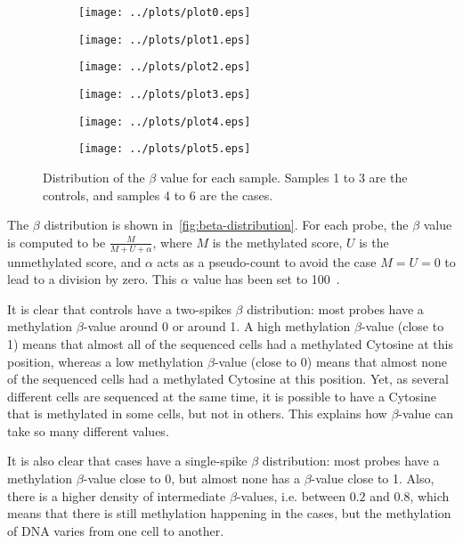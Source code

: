 \documentclass{article}
\begin{document}
\begin{figure*}[!t]
	\begin{subfigure}{.33\textwidth}
	\texttt{[image: ../plots/plot0.eps]}
	\end{subfigure}
	\begin{subfigure}{.33\textwidth}
	\texttt{[image: ../plots/plot1.eps]}
	\end{subfigure}
	\begin{subfigure}{.33\textwidth}
	\texttt{[image: ../plots/plot2.eps]}
	\end{subfigure}
	\begin{subfigure}{.33\textwidth}
	\texttt{[image: ../plots/plot3.eps]}
	\end{subfigure}
	\begin{subfigure}{.33\textwidth}
	\texttt{[image: ../plots/plot4.eps]}
	\end{subfigure}
	\begin{subfigure}{.33\textwidth}
	\texttt{[image: ../plots/plot5.eps]}
	\end{subfigure}
	\caption{Distribution of the $\beta$ value for each sample. Samples 1 to 3 are the controls, and samples 4 to 6 are the cases.
	\label{fig:beta-distribution}}
\end{figure*}

The $\beta$ distribution is shown in~\autoref{fig:beta-distribution}. For each probe, the $\beta$ value is computed to be $\frac M{M+U+\alpha}$,
where $M$ is the methylated score, $U$ is the unmethylated score, and $\alpha$ acts as a pseudo-count to avoid the case $M=U=0$ to lead
to a division by zero. This $\alpha$ value has been set to 100~\cite{du2010comparison}.

It is clear that controls have a two-spikes $\beta$ distribution: most probes have a methylation $\beta$-value around 0 or around 1.
A high methylation $\beta$-value (close to 1) means that almost all of the sequenced cells had a methylated Cytosine at this position,
whereas a low methylation $\beta$-value (close to 0) means that almost none of the sequenced cells had a methylated Cytosine at this
position. Yet, as several different cells are sequenced at the same time, it is possible to have a Cytosine that is methylated in
some cells, but not in others. This explains how $\beta$-value can take so many different values.

It is also clear that cases have a single-spike $\beta$ distribution: most probes have a methylation $\beta$-value close to 0,
but almost none has a $\beta$-value close to 1. Also, there is a higher density of intermediate $\beta$-values, i.e. between $0.2$
and $0.8$, which means that there is still methylation happening in the cases, but the methylation of DNA varies from one cell
to another.
\end{document}
